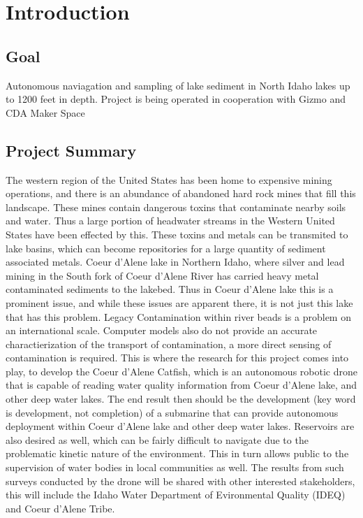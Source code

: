\documentclass[12pt]{article}
\begin{document}
	\tableofcontents
	\newpage
	
	\section{Introduction}
	
		\subsection{Goal}
		Autonomous naviagation and sampling of lake sediment in North Idaho lakes up to 1200 feet in depth. Project is being operated in cooperation with Gizmo and CDA Maker Space
	
		\subsection{Project Summary}
		The western region of the United States has been home to expensive mining operations, and there is an abundance of abandoned hard rock mines that fill this landscape. These mines contain dangerous toxins that contaminate nearby soils and water. Thus a large portion of headwater streams in the Western United States have been effected by this. These toxins and metals can be transmited to lake basins, which can become repositories for a large quantity of sediment associated metals. Coeur d'Alene lake in Northern Idaho, where silver and lead mining in the South fork of Coeur d'Alene River has carried heavy metal contaminated sediments to the lakebed. Thus in Coeur d'Alene lake this is a prominent issue, and while these issues are apparent there, it is not just this lake that has this problem. Legacy Contamination within river beads is a problem on an international scale. Computer models also do not provide an accurate charactierization of the transport of contamination, a more direct sensing of contamination is required. This is where the research for this project comes into play, to develop the Coeur d'Alene Catfish, which is an autonomous robotic drone that is capable of reading water quality information from Coeur d'Alene lake, and other deep water lakes. The end result then should be the development (key word is development, not completion) of a submarine that can provide autonomous deployment within Coeur d'Alene lake and other deep water lakes. Reservoirs are also desired as well, which can be fairly difficult to navigate due to the problematic kinetic nature of the environment. This in turn allows public to the supervision of water bodies in local communities as well. The results from such surveys conducted by the drone will be shared with other interested stakeholders, this will include the Idaho Water Department of Evironmental Quality (IDEQ) and Coeur d'Alene Tribe.\\
\end{document}
